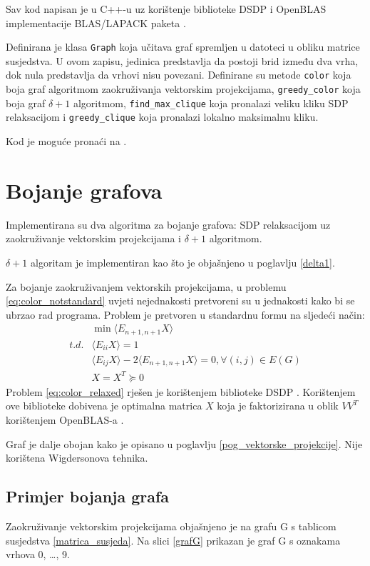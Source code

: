 \documentclass[diplomskirad]{fer}
\begin{document}
Sav kod napisan je u C++-u uz korištenje biblioteke DSDP \cite{dsdp-user-guide} i OpenBLAS implementacije BLAS/LAPACK paketa \cite{openBLAS}.

Definirana je klasa \verb|Graph| koja učitava graf spremljen u datoteci u obliku matrice susjedstva. U ovom zapisu,
jedinica predstavlja da postoji brid između dva vrha, dok nula predstavlja da vrhovi nisu povezani. Definirane su metode \verb|color| koja boja graf
algoritmom zaokruživanja vektorskim projekcijama, \verb|greedy_color| koja boja graf $\delta + 1$ algoritmom, \verb|find_max_clique| koja
pronalazi veliku kliku SDP relaksacijom i \verb|greedy_clique| koja pronalazi lokalno maksimalnu kliku.

Kod je moguće pronaći na \cite{key}.

\section{Bojanje grafova}
Implementirana su dva algoritma za bojanje grafova: SDP relaksacijom uz zaokruživanje vektorskim projekcijama i $\delta + 1$ algoritmom.

$\delta + 1$ algoritam je implementiran kao što je objašnjeno u poglavlju \ref{delta1}.

Za bojanje zaokruživanjem vektorskih projekcijama, u problemu \ref{eq:color_notstandard} uvjeti nejednakosti pretvoreni su u jednakosti kako bi se
ubrzao rad programa. Problem je pretvoren u standardnu formu na sljedeći način:
\begin{equation} \label{eq:color_relaxed}
  \begin{split}
    & \min \langle E_{n+1,n+1}X \rangle \\
    t.d. & \langle E_{ii}X \rangle = 1 \\
         & \langle E_{ij}X \rangle - 2 \langle E_{n+1,n+1}X \rangle = 0, \forall (i,j) \in E(G) \\
         & X=X^T \succeq 0 
  \end{split}
\end{equation}
Problem \ref{eq:color_relaxed} rješen je korištenjem biblioteke DSDP \cite{dsdp-user-guide}.
Korištenjem ove biblioteke dobivena je optimalna matrica $X$ koja je faktorizirana u oblik $VV^T$ korištenjem
OpenBLAS-a \cite{openBLAS}.

Graf je dalje obojan kako je opisano u poglavlju \ref{pog_vektorske_projekcije}. Nije korištena Wigdersonova tehnika.

\subsection{Primjer bojanja grafa}
Zaokruživanje vektorskim projekcijama objašnjeno je na grafu G s tablicom susjedstva \ref{matrica_susjeda}.
Na slici \ref{grafG} prikazan je graf G s oznakama vrhova
0, \dots, 9.
\end{document}
